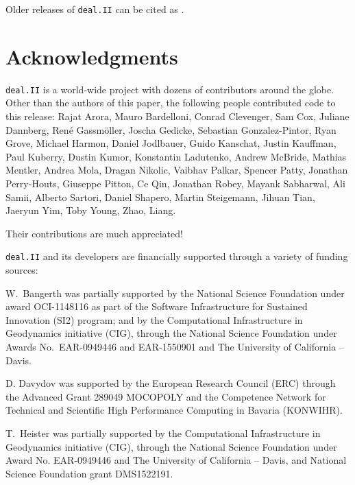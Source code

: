 \documentclass{ansarticle-preprint}
\newcommand{\specialword}[1]{\texttt{#1}}
\newcommand{\dealii}{{\specialword{deal.II}}}
\begin{document}
Older releases of \dealii{} can be cited as \cite{dealII80,dealII81,dealII82,dealII83,dealII84}.

\nocite{BangerthKanschat1999}

\section{Acknowledgments}

\dealii{} is a world-wide project with dozens of contributors around the
globe. Other than the authors of this paper, the following people contributed code to
this release:
%
%
Rajat  Arora,
Mauro  Bardelloni,
Conrad  Clevenger,
Sam  Cox,
Juliane  Dannberg,
Ren{\'e}  Gassm{\"o}ller,
Joscha  Gedicke,
Sebastian  Gonzalez-Pintor,
Ryan  Grove,
Michael  Harmon,
Daniel  Jodlbauer,
Guido  Kanschat,
Justin  Kauffman,
Paul  Kuberry,
Dustin  Kumor,
Konstantin  Ladutenko,
Andrew  McBride,
Mathias  Mentler,
Andrea  Mola,
Dragan  Nikolic,
Vaibhav  Palkar,
Spencer  Patty,
Jonathan  Perry-Houts,
Giuseppe  Pitton,
Ce  Qin,
Jonathan  Robey,
Mayank  Sabharwal,
Ali  Samii,
Alberto  Sartori,
Daniel  Shapero,
Martin  Steigemann,
Jihuan  Tian,
Jaeryun  Yim,
Toby  Young,
Zhao, Liang.

Their contributions are much appreciated!


\bigskip

\dealii{} and its developers are financially supported through a
variety of funding sources:

W.~Bangerth was partially
supported by the National Science Foundation under award OCI-1148116
as part of the Software Infrastructure for Sustained Innovation (SI2)
program; and by the Computational Infrastructure in Geodynamics initiative
(CIG), through the National Science Foundation under Awards
No.~EAR-0949446 and EAR-1550901 and The University of California -- Davis.

D. Davydov was supported by the European Research Council (ERC) through the Advanced Grant 289049 MOCOPOLY and the Competence Network for Technical and Scientific High Performance Computing in Bavaria (KONWIHR).

T.~Heister was partially supported by the Computational Infrastructure in
Geodynamics initiative (CIG), through the National Science Foundation
under Award No. EAR-0949446 and The University of California -- Davis, and National Science Foundation grant DMS1522191.
\end{document}
